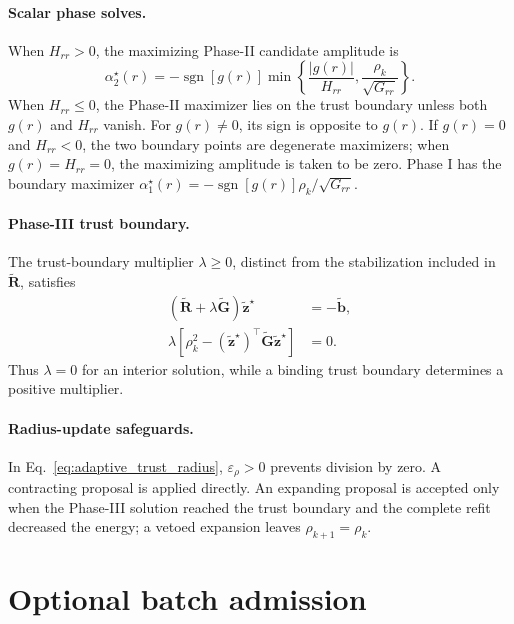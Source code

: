 \documentclass[
  reprint,
  amsmath,
  amssymb,
  aps,
  pra,
  nofootinbib,
  superscriptaddress,
  floatfix
]{revtex4-2}
\begin{document}
\paragraph*{Scalar phase solves.}
When \(H_{rr}>0\), the maximizing Phase-II candidate amplitude is
\begin{equation}
\alpha_2^\star(r)
=-\operatorname{sgn}[g(r)]
\min\!\left\{
\frac{|g(r)|}{H_{rr}},
\frac{\rho_k}{\sqrt{G_{rr}}}
\right\}.
\label{eq:phase2_alpha_star}
\end{equation}
When \(H_{rr}\le0\), the Phase-II maximizer lies on the trust boundary unless
both \(g(r)\) and \(H_{rr}\) vanish. For \(g(r)\ne0\), its sign is opposite to
\(g(r)\). If \(g(r)=0\) and \(H_{rr}<0\), the two boundary points are
degenerate maximizers; when \(g(r)=H_{rr}=0\), the maximizing amplitude is
taken to be zero. Phase I has the boundary maximizer
\(\alpha_1^\star(r)=-\operatorname{sgn}[g(r)]\rho_k/\sqrt{G_{rr}}\).

\paragraph*{Phase-III trust boundary.}
The trust-boundary multiplier \(\lambda\ge0\), distinct from the stabilization
included in \(\widetilde{\mathbf R}\), satisfies
\begin{equation}
\begin{aligned}
(\widetilde{\mathbf R}+\lambda\widetilde{\mathbf G})
\widetilde{\mathbf z}^{\star}
&=-\widetilde{\mathbf b},\\
\lambda\left[
\rho_k^2-(\widetilde{\mathbf z}^{\star})^{\top}
\widetilde{\mathbf G}\widetilde{\mathbf z}^{\star}
\right]&=0.
\end{aligned}
\label{eq:phase3_joint_kkt}
\end{equation}
Thus \(\lambda=0\) for an interior solution, while a binding trust boundary
determines a positive multiplier.

\paragraph*{Radius-update safeguards.}
In Eq.~\eqref{eq:adaptive_trust_radius}, \(\varepsilon_\rho>0\) prevents
division by zero. A contracting proposal is applied directly. An expanding
proposal is accepted only when the Phase-III solution reached the trust
boundary and the complete refit decreased the energy; a vetoed expansion
leaves \(\rho_{k+1}=\rho_k\).


\section{Optional batch admission}
\label{app:batching}
\end{document}
